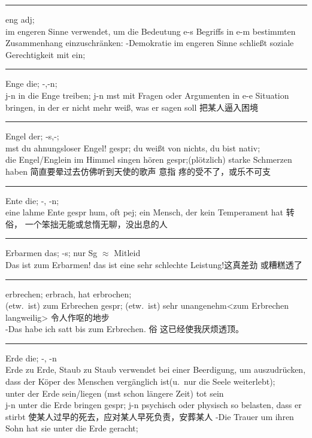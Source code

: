 \noindent\rule{\textwidth}{1pt}
eng adj;\\
im engeren Sinne verwendet, um die Bedeutung e-s Begriffs in e-m bestimmten Zusammenhang einzuschr\"anken: -Demokratie im engeren Sinne schlie\ss{}t soziale Gerechtigkeit mit ein; \\

\noindent\rule{\textwidth}{1pt}
Enge die; -,-n;\\
j-n in die Enge treiben; j-n mst mit Fragen oder Argumenten in e-e Situation bringen, in der er nicht mehr wei\ss{}, was er sagen soll  把某人逼入困境\\

\noindent\rule{\textwidth}{1pt}
Engel der; -s,-; \\
mst du ahnungsloser Engel! gespr; du wei\ss{}t von nichts, du bist nativ;\\
die Engel/Englein im Himmel singen h\"oren gespr;(pl\"otzlich) starke Schmerzen haben 简直要晕过去仿佛听到天使的歌声 意指 疼的受不了，或乐不可支\\

\noindent\rule{\textwidth}{1pt}
Ente die; -, -n; \\
eine lahme Ente gespr hum, oft pej; ein Mensch, der kein Temperament hat 转 俗， 一个笨拙无能或怠惰无聊，没出息的人\\

\noindent\rule{\textwidth}{1pt}
Erbarmen das; -s; nur Sg $\approx$ Mitleid \\
Das ist zum Erbarmen! das ist eine sehr schlechte Leistung!这真差劲 或糟糕透了\\

\noindent\rule{\textwidth}{1pt}
erbrechen; erbrach, hat erbrochen;\\
(etw.\ ist) zum Erbrechen gespr; (etw.\ ist) sehr unangenehm<zum Erbrechen langweilig> 令人作呕的地步\\
-Das habe ich satt bis zum Erbrechen. 俗 这已经使我厌烦透顶。\\

\noindent\rule{\textwidth}{1pt}
Erde die; -, -n\\
Erde zu Erde, Staub zu Staub verwendet bei einer Beerdigung, um auszudr\"ucken, dass der K\"oper des Menschen verg\"anglich ist(u.\ nur die Seele weiterlebt);\\
unter der Erde sein/liegen (mst schon l\"angere Zeit) tot sein\\
j-n unter die Erde bringen gespr; j-n psychisch oder physisch so belasten, dass er stirbt 使某人过早的死去，应对某人早死负责，安葬某人 -Die Trauer um ihren Sohn hat sie unter die Erde geracht;

